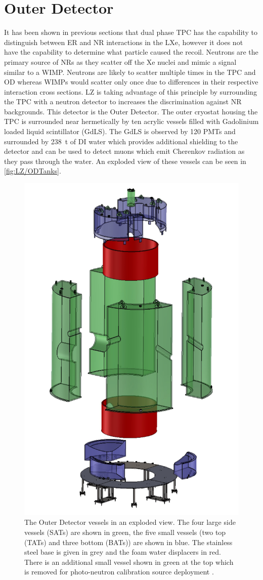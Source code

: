 \section{Outer Detector}\label{sec:LZ/LZOD}
It has been shown in previous sections that dual phase TPC has the capability to distinguish between ER and NR interactions in the LXe, however it does not have the capability to determine what particle caused the recoil. Neutrons are the primary source of NRs as they scatter off the Xe nuclei and mimic a signal similar to a WIMP. Neutrons are likely to scatter multiple times in the TPC and OD whereas WIMPs would scatter only once due to differences in their respective interaction cross sections. LZ is taking advantage of this principle by surrounding the TPC with a neutron detector to increases the discrimination against NR backgrounds. This detector is the Outer Detector.
The outer cryostat housing the TPC is surrounded near hermetically by ten acrylic vessels filled with  Gadolinium loaded liquid scintillator (GdLS). The GdLS is observed by 120 PMTs and surrounded by 238~t of DI water which provides additional shielding to the detector and can be used to detect muons which emit Cherenkov radiation as they pass through the water. An exploded view of these vessels can be seen in \autoref{fig:LZ/ODTanks}.
\begin{figure}[!ht]
    \centering
    \includegraphics[width=0.5\linewidth]{figures/LZ/CAD_ODTanks.jpg}
    \caption{The Outer Detector vessels in an exploded view. The four large side vessels (SATs) are shown in green, the five small vessels (two top (TATs) and three bottom (BATs)) are shown in blue. The stainless steel base is given in grey and the foam water displacers in red. There is an additional small vessel shown in green at the top which is removed for photo-neutron calibration source deployment \cite{LZNIMA}.}
    \label{fig:LZ/ODTanks}
\end{figure}

